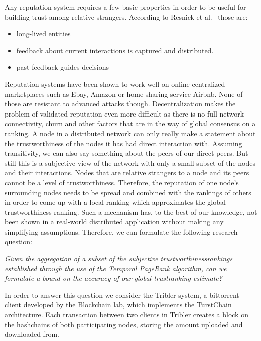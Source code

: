 
Any reputation system requires a few basic properties in order to be useful for 
building trust among relative strangers. According to Resnick et al.~\cite{resnick2000reputation} those are:

\begin{itemize}
\item long-lived entities
\item feedback about current interactions is captured and distributed.
\item past feedback guides decisions
\end{itemize}

Reputation systems have been shown to work well on online centralized marketplaces such
as Ebay, Amazon or home sharing service Airbnb. None of those are resistant to advanced 
attacks though. Decentralization makes the problem of validated reputation even more difficult
as there is no full network connectivity, churn and other factors that are in the way of global 
consensus on a ranking. A node in a distributed network can only really make a statement about 
the trustworthiness of the nodes it has had direct interaction with. Assuming transitivity, we 
can also say something about the peers of our direct peers. But still this is a subjective view
of the network with only a small subset of the nodes and their interactions. Nodes that are 
relative strangers to a node and its peers cannot be a level of trustworthiness. Therefore,
the reputation of one node's surrounding nodes needs to be spread and combined with the rankings of others
in order to come up with a local ranking which approximates the global trustworthiness ranking.
Such a mechanism has, to the best of our knowledge, not been shown in a real-world distributed application without making any
simplifying assumptions. Therefore, we can formulate the following research question:

\begin{center}
\textit{Given the aggregation of a subset of the subjective trustworthinessrankings established through the use of the Temporal PageRank algorithm, 
can we formulate a bound on the accuracy of our global trustranking estimate?}
\end{center}

In order to answer this question we consider the Tribler system, a bittorrent client developed
by the Blockchain lab, which implements the TurstChain architecture. Each transaction between two 
clients in Tribler creates a block on the hashchains of both participating nodes, storing the 
amount uploaded and downloaded from.  

%
